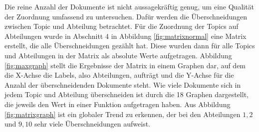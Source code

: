 \documentclass[german,version-2020-11]{uzl-thesis}
\begin{document}
Die reine Anzahl der Dokumente ist nicht aussagekräftig genug, um eine Qualität der Zuordnung umfassend zu untersuchen. Dafür werden die Überschneidungen zwischen Topic und Abteilung betrachtet. Für die Zuordnung der Topics auf Abteilungen wurde in Abschnitt 4 in Abbildung \ref{fig:matrixnormal} eine Matrix erstellt, die alle Überschneidungen gezählt hat. Diese wurden dann für alle Topics und Abteilungen in der Matrix als absolute Werte aufgetragen. Abbildung \ref{fig:maxgraph} stellt die Ergebnisse der Matrix in einem Graphen dar, auf dem die X-Achse die Labels, also Abteilungen, aufträgt und die Y-Achse für die Anzahl der überschneidenden Dokumente steht. Wie viele Dokumente sich in jedem Topic und Abteilung überschneiden ist durch die 18 Graphen dargestellt, die jeweils den Wert in einer Funktion aufgetragen haben. Aus Abbildung \ref{fig:matrixgraph} ist ein globaler Trend zu erkennen, der bei den Abteilungen $1,2$ und $9,10$ sehr viele Überschneidungen aufweist. 
\end{document}
